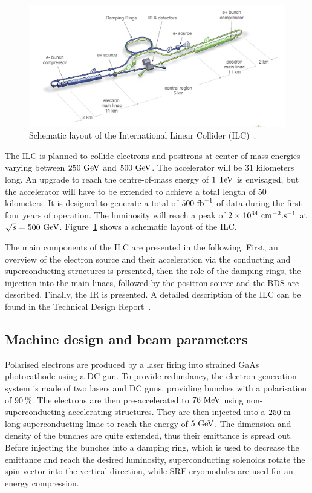    \begin{figure}[!h]
      \centering
      \includegraphics[width = 16 cm]{Pictures/ILC/ILC_new.png}
      \caption{Schematic layout of the International Linear Collider (ILC)~\cite{Behnke2013}.}
      \label{fig:ILC}
    \end{figure}


    The \gls{ILC} is planned to collide electrons and positrons at center-of-mass energies varying between $250~\rm{GeV}$ and $500~\rm{GeV}$.
    The accelerator will be $31$ kilometers long.
    An upgrade to reach the centre-of-mass energy of $1~\rm{TeV}$ is envisaged, but the accelerator will have to be extended to achieve a total length of 50 kilometers.
    It is designed to generate a total of $500~\rm{fb}^{-1}$ of data during the first four years of operation. 
    The luminosity will reach a peak of $2 \times 10^{34}~\rm{cm}^{-2}\rm{.s}^{-1}$ at $\sqrt s = 500~\rm{GeV}$.
    Figure~\ref{fig:ILC} shows a schematic layout of the \gls{ILC}.

    The main components of the \gls{ILC} are presented in the following.
    First, an overview of the electron source and their acceleration via the conducting and superconducting structures is presented, then the role of the damping rings, the injection into the main linacs, followed by the positron source and the \gls{BDS} are described.
    Finally, the \gls{IR} is presented.
    A detailed description of the \gls{ILC} can be found in the Technical Design Report~\cite{Appleby2006}.

    \subsection{Machine design and beam parameters}
    \label{subsec:design}

    Polarised electrons are produced by a laser firing into strained GaAs photocathode using a \gls{DC} gun.
    To provide redundancy, the electron generation system is made of two lasers and \gls{DC} guns, providing bunches with a polarisation of $90~\%$.
    The electrons are then pre-accelerated to $76~\rm{MeV}$ using non-superconducting accelerating structures.
    They are then injected into a $250~\rm{m}$ long superconducting linac to reach the energy of $5~\rm{GeV}$.
    The dimension and density of the bunches are quite extended, thus their emittance is spread out.
    Before injecting the bunches into a damping ring, which is used to decrease the emittance and reach the desired luminosity, superconducting solenoids rotate the spin vector into the vertical direction, while \gls{SRF} cryomodules are used for an energy compression.
 
